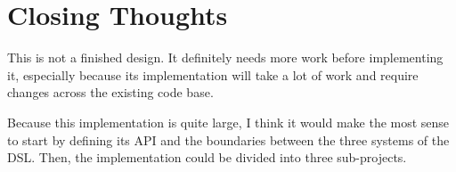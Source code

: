 \section{Closing Thoughts}

This is not a finished design. It definitely needs more work before
implementing it, especially because its implementation will take a lot of work
and require changes across the existing code base.

Because this implementation is quite large, I think it would make the most
sense to start by defining its API and the boundaries between the three systems
of the DSL. Then, the implementation could be divided into three
sub-projects.
